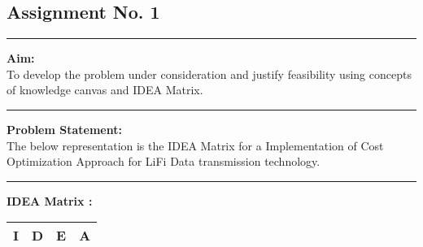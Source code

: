 \documentclass[11pt,a4paper]{report}
\begin{document}
\begin{center}
\section*{Assignment No. 1} 
\end{center}
\rule{\textwidth}{1pt}
\textbf{Aim:\\} To develop the problem under consideration and justify feasibility using concepts of knowledge canvas and IDEA Matrix.\\
\rule{\textwidth}{1pt}
\textbf{Problem Statement:\\} The below representation is the IDEA Matrix for a Implementation of Cost Optimization Approach for LiFi Data transmission technology.\\
\rule{\textwidth}{1pt}
\textbf{IDEA Matrix :}
\begin{table}[h]
\begin{center}
\begin{tabular}{|l|l|l|l|}
\hline
\multicolumn{1}{|c|}{\textbf{I}}                                                                                                                               & \multicolumn{1}{c|}{\textbf{D}}                                                                              & \multicolumn{1}{c|}{\textbf{E}}                                                                                                                                                               & \multicolumn{1}{c|}{\textbf{A}}                                                                                                          \\ \hline

\end{tabular}
\end{center}
\end{table}
\end{document}
